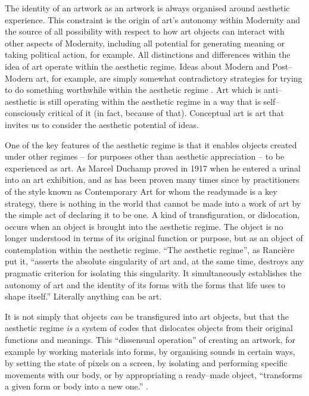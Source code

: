 \documentclass[letterpaper]{article}
\begin{document}
    The identity of an artwork as an artwork is always organised around aesthetic experience. This constraint is the origin of art's autonomy within Modernity and the source of all possibility with respect to how art objects can interact with other aspects of Modernity, including all potential for generating meaning or taking political action, for example. All distinctions and differences within the idea of art operate within the aesthetic regime. Ideas about Modern and Post–Modern art, for example, are simply somewhat contradictory strategies for trying to do something worthwhile within the aesthetic regime \citep[p213]{ZepkeSblmArt2017}. Art which is anti–aesthetic is still operating within the aesthetic regime in a way that is self–consciously critical of it (in fact, because of that). Conceptual art is art that invites us to consider the aesthetic potential of ideas.

    One of the key features of the aesthetic regime is that it enables objects created under other regimes – for purposes other than aesthetic appreciation – to be experienced as art. As Marcel Duchamp proved in 1917 when he entered a urinal into an art exhibition, and as has been proven many times since by practitioners of the style known as Contemporary Art for whom the readymade is a key strategy, there is nothing in the world that cannot be made into a work of art by the simple act of declaring it to be one. A kind of transfiguration, or dislocation, occurs when an object is brought into the aesthetic regime. The object is no longer understood in terms of its original function or purpose, but as an object of contemplation within the aesthetic regime. “The aesthetic regime”, as Rancière put it, “asserts the absolute singularity of art and, at the same time, destroys any pragmatic criterion for isolating this singularity. It simultaneously establishes the autonomy of art and the identity of its forms with the forms that life uses to shape itself.” Literally anything can be art.
    
    It is not simply that objects \emph{can} be transfigured into art objects, but that the aesthetic regime \emph{is} a system of codes that dislocates objects from their original functions and meanings. This “dissensual operation” of creating an artwork, for example by working materials into forms, by organising sounds in certain ways, by setting the state of pixels on a screen, by isolating and performing specific movements with our body, or by appropriating a ready–made object, “transforms a given form or body into a new one.” \citep[p.54]{RancierThEmncptdSpcttr2009}.
\end{document}
